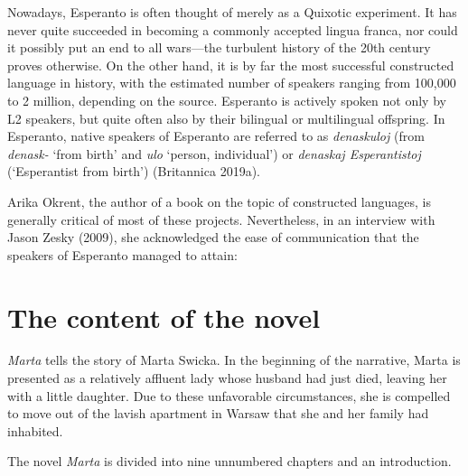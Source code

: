 Nowadays, Esperanto is often thought of merely as a Quixotic experiment.
It has never quite succeeded in becoming a commonly accepted lingua franca, nor could it possibly put an end to all wars---the turbulent history of the 20th century proves otherwise.
On the other hand, it is by far the most successful constructed language in history, with the estimated number of speakers ranging from 100,000 to 2 million, depending on the source.
Esperanto is actively spoken not only by L2 speakers, but quite often also by their bilingual or multilingual offspring.
In Esperanto, native speakers of Esperanto are referred to as \textit{denaskuloj} (from \textit{denask-} `from birth' and \textit{ulo} `person, individual') or \textit{denaskaj Esperantistoj} (`Esperantist from birth')
(Britannica 2019a).

Arika Okrent, the author of a book on the topic of constructed languages, is generally critical of most of these projects.
Nevertheless, in an interview with Jason Zesky (2009), she acknowledged the ease of communication that the speakers of Esperanto managed to attain:


\section{The content of the novel}
\textit{Marta} tells the story of Marta Swicka.
In the beginning of the narrative, Marta is presented as a relatively affluent lady whose husband had just died, leaving her with a little daughter. %
Due to these unfavorable circumstances, she is compelled to move out of the lavish apartment in Warsaw that she and her family had inhabited.

The novel \textit{Marta} is divided into nine unnumbered chapters and an introduction. 